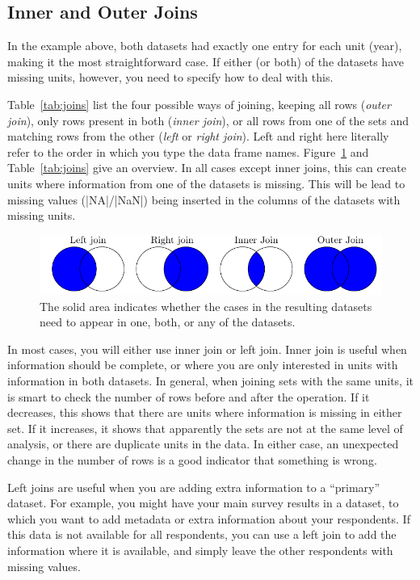 {\subsection{Inner and Outer Joins}

In the example above, both datasets had exactly one entry for each unit (year), making it the most straightforward case.
If either (or both) of the datasets have missing units, however, you need to specify how to deal with this.

Table~\ref{tab:joins} list the four possible ways of joining, keeping all rows (\emph{outer join}), only rows present in both (\emph{inner join}), or all rows from one of the sets and matching rows from the other (\emph{left} or \emph{right join}). Left and right here literally refer to the order in which you type the data frame names. Figure~\ref{fig:joinvenn} and Table~\ref{tab:joins} give an overview.
In all cases except inner joins, this can create units where information from one of the datasets is missing.
This will be lead to missing values (|NA|/|NaN|) being inserted in the columns of the datasets with missing units.

\begin{figure}
    \centering
    \includegraphics{figures/ch07_figjoins}
    \caption{The solid area indicates whether the cases in the resulting datasets need to appear in one, both, or any of the datasets.}
    \label{fig:joinvenn}
\end{figure}



In most cases, you will either use inner join or left join.
Inner join is useful when information should be complete,
or where you are only interested in units with information in both datasets.
In general, when joining sets with the same units, it is smart to check the number of rows before and after the operation.
If it decreases, this shows that there are units where information is missing in either set.
If it increases, it shows that apparently the sets are not at the same level of analysis,
or there are duplicate units in the data.
In either case, an unexpected change in the number of rows is a good indicator that something is wrong.

Left joins are useful when you are adding extra information to a ``primary'' dataset.
For example, you might have your main survey results in a dataset,
to which you want to add metadata or extra information about your respondents.
If this data is not available for all respondents, you can use a left join to add the information
where it is available, and simply leave the other respondents with missing values.


}

